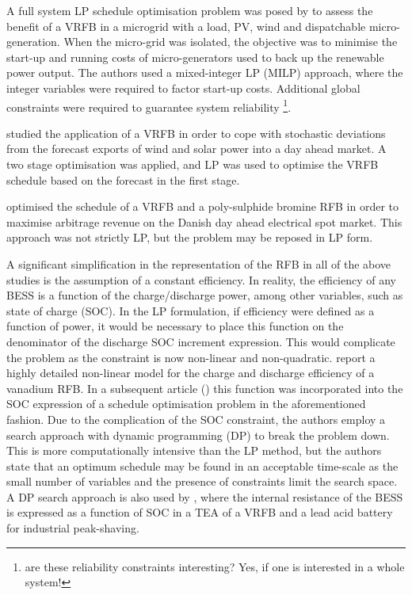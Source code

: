 \documentclass[preprint,3p,review,authoryear,10pt]{elsarticle}
\newcommand{\sol}[1]{\footnote{#1}\marginpar{\fbox{\thefootnote}}}
\begin{document}
A full system LP schedule optimisation problem was posed by \cite{Chen2012} to assess the benefit of a VRFB in a microgrid with a load, PV, wind and dispatchable micro-generation. When the micro-grid was isolated, the objective was to minimise the start-up and running costs of micro-generators used to back up the renewable power output. The authors used a mixed-integer LP (MILP) approach, where the integer variables were required to factor start-up costs. Additional global constraints were required to guarantee system reliability \sol{are these reliability constraints interesting? Yes, if one is interested in a whole system!}.

\cite{Gomes2017}  studied the application of a VRFB in order to cope with stochastic deviations from the forecast exports of wind and solar power into a day ahead market. A two stage optimisation was applied, and LP was used to optimise the VRFB schedule based on the forecast  in the first stage.

\cite{Hu2010} optimised the schedule of a VRFB and a poly-sulphide bromine RFB in order to maximise arbitrage revenue on the Danish day ahead electrical spot market. This approach was not strictly LP, but the problem may be reposed in LP form.

A significant simplification in the representation of the RFB in all of the above studies is the assumption of a constant efficiency. In reality, the efficiency of any BESS is a function of the charge/discharge power, among other variables, such as state of charge (SOC). In the LP formulation, if efficiency were defined as a  function of power, it would be necessary to place this function on the denominator of the  discharge SOC increment expression. This would complicate the problem as the constraint is now non-linear and non-quadratic. \cite{Nguyen2014} report a highly detailed non-linear model for the charge and discharge efficiency of a vanadium RFB. In a subsequent article (\cite{Nguyen2015}) this function was incorporated into the SOC expression of a schedule optimisation problem in the aforementioned fashion. Due to the complication of the SOC constraint, the authors employ a search approach with dynamic programming (DP) to break the problem down. This is more computationally intensive than the LP method, but the authors state that an optimum schedule may be found in an acceptable time-scale as the small number of variables and the presence of constraints limit the search space.
A DP search approach is also used by \cite{Oudalov2007}, where the internal resistance of the BESS is expressed as a function of SOC in a TEA of a VRFB and a lead acid battery for industrial peak-shaving.
\end{document}
